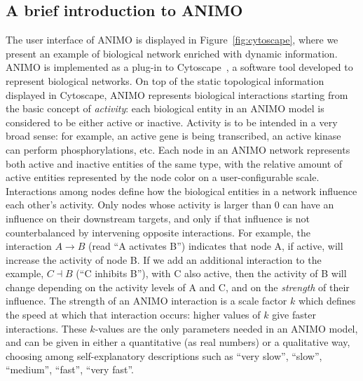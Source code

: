 \documentclass{bmcart}
\begin{document}
\subsection*{A brief introduction to ANIMO}
The user interface of ANIMO is displayed in Figure~\ref{fig:cytoscape},
where we present an example of biological network enriched with dynamic information.
ANIMO is implemented as a plug-in to Cytoscape~\cite{cytoscape}, a software tool developed to represent biological networks.
On top of the static topological information displayed in Cytoscape, ANIMO represents
biological interactions starting from the basic concept of \emph{activity}:
each biological entity in an ANIMO model is considered to be either active or inactive.
Activity is to be intended in a very broad sense: for example, an active gene is being transcribed,
an active kinase can perform phosphorylations, etc. Each node in an ANIMO network represents
both active and inactive entities of the same type, with the relative amount of active entities
represented by the node color on a user-configurable scale. Interactions among nodes define
how the biological entities in a network influence each other's activity.
Only nodes whose activity is larger than 0 can have an 
influence on their downstream targets, and only if that influence is not counterbalanced by intervening opposite interactions.
For example, the interaction $A\rightarrow B$ (read ``A activates B'') indicates that node A, if active,
will increase the activity of node B. If we add an additional interaction to the example,
$C \dashv$\hspace{0.1em}$B$ (``C inhibits B''), with C also active, then the activity of B will change depending on the
activity levels of A and C, and on the \emph{strength} of their influence.
The strength of an ANIMO interaction is a scale factor $k$ which defines the speed at which
that interaction occurs: higher values of $k$ give faster interactions. These $k$-values are
the only parameters needed in an ANIMO model, and can be given in either
a quantitative (as real numbers) or a qualitative way, choosing among self-explanatory descriptions
such as ``very slow'', ``slow'', ``medium'', ``fast'', ``very fast''.
\end{document}
